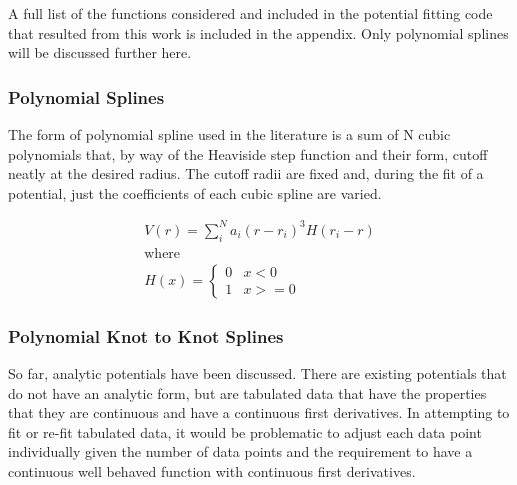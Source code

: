 A full list of the functions considered and included in the potential fitting code that resulted from this work is included in the appendix.  Only polynomial splines will be discussed further here.



\subsubsection{Polynomial Splines}

The form of polynomial spline used in the literature is a sum of N cubic polynomials that, by way of the Heaviside step function and their form, cutoff neatly at the desired radius.  The cutoff radii are fixed and, during the fit of a potential, just the coefficients of each cubic spline are varied.

\begin{equation}
\begin{split}
V(r) = \sum_i^N a_i (r - r_i)^3 H(r_i - r) \\
\text{where } \\
H(x) = \left\{ \begin{matrix} 0 & x<0 \\  1 & x >= 0 \end{matrix} \right . 
\end{split}
\label{eq:cubicSpline}
\end{equation}


\subsubsection{Polynomial Knot to Knot Splines}

So far, analytic potentials have been discussed.  There are existing potentials that do not have an analytic form, but are tabulated data that have the properties that they are continuous and have a continuous first derivatives.  In attempting to fit or re-fit tabulated data, it would be problematic to adjust each data point individually given the number of data points and the requirement to have a continuous well behaved function with continuous first derivatives.

